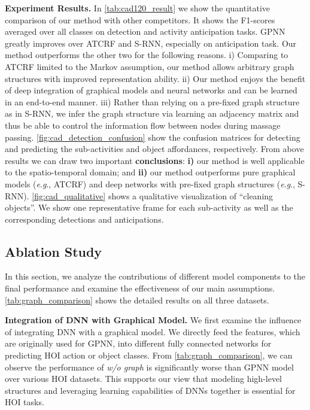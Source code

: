 \documentclass[runningheads]{llncs}
\newcommand{\eg}{\textit{e}.\textit{g}.}
\begin{document}
\noindent\textbf{Experiment Results.} In \autoref{tab:cad120_result} we show the quantitative comparison of our method with other competitors. It shows the F1-scores averaged over all classes on detection and activity anticipation tasks. GPNN greatly improves over ATCRF and S-RNN, especially on anticipation task. Our method outperforms the other two for the following reasons. i) Comparing to ATCRF limited to the Markov assumption, our method allows arbitrary graph structures with improved representation ability. ii) Our method enjoys the benefit of deep integration of graphical models and neural networks and can be learned in an end-to-end manner. iii) Rather than relying on a pre-fixed graph structure as in S-RNN, we infer the graph structure via learning an adjacency matrix and thus be able to control the information flow between nodes during massage passing. \autoref{fig:cad_detection_confusion} show the confusion matrices for detecting and predicting the sub-activities and object affordances, respectively. From above results we can draw two important \textbf{conclusions}:
\textbf{i)} our method is well applicable to the spatio-temporal domain; and \textbf{ii)} our method outperforms pure graphical models (\eg, ATCRF) and deep networks with pre-fixed graph structures (\eg, S-RNN).
\autoref{fig:cad_qualitative} shows a qualitative visualization of ``cleaning objects''. We show one representative frame for each sub-activity as well as the corresponding detections and anticipations.








\subsection{Ablation Study}
\label{sec:abastudy}
In this section, we analyze the contributions of different model components to the final performance and examine the effectiveness of our main assumptions. \autoref{tab:graph_comparison} shows the detailed results on all three datasets.

\noindent\textbf{Integration of DNN with Graphical Model.} We first examine the influence of integrating DNN with a graphical model. We directly feed the features, which are originally used for GPNN, into different fully connected networks for predicting HOI action or object classes. From \autoref{tab:graph_comparison}, we can observe the performance of \textit{w/o graph} is significantly worse than GPNN model over various HOI datasets. This supports our view that modeling high-level structures and leveraging learning capabilities of DNNs together is essential for HOI tasks.
\end{document}
